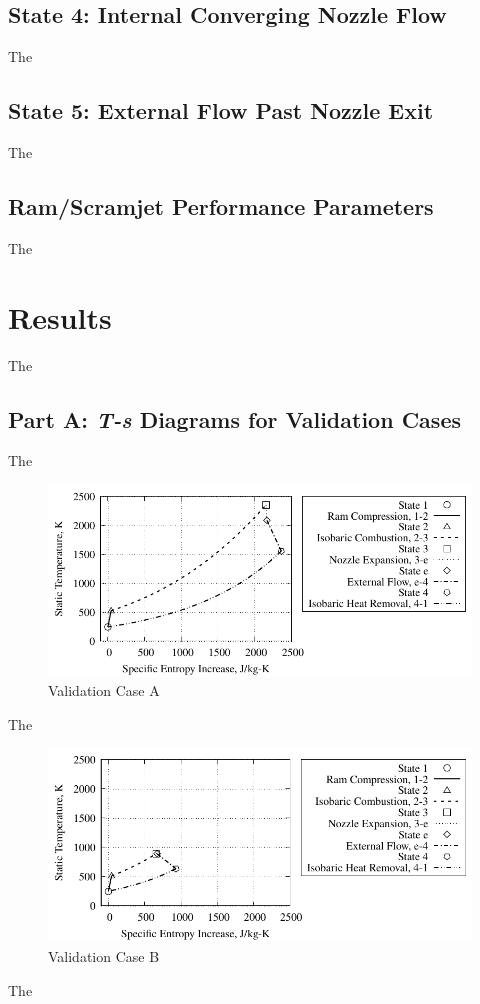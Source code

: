 \documentclass[conf]{new-aiaa} %
\begin{document}
\subsection{State 4: Internal Converging Nozzle Flow}
The

\subsection{State 5: External Flow Past Nozzle Exit}
The

\subsection{Ram/Scramjet Performance Parameters}
The


\section{Results}
The

\subsection{Part A: \textit{T-s} Diagrams for Validation Cases}
The

\begin{figure}[hbt!] %
    \centering
    \includegraphics[]{media/ts_plot_files/TS_plot_for_case_7.pdf}
    \caption{\label{fig:partavalida}Validation Case A}
\end{figure}
The

\begin{figure}[hbt!] %
    \centering
    \includegraphics[]{media/ts_plot_files/TS_plot_for_case_8.pdf}
    \caption{\label{fig:partavalidb}Validation Case B}
\end{figure}
The
\end{document}
